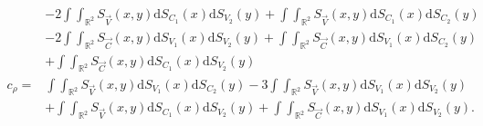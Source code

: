 \begin{theorem}
\begin{align*}
        &-2\int\int_{\mathbb{R}^2}S_{\vec{V}}\left(x,y\right)\mathrm{d}S_{C_1}\left(x\right)\mathrm{d}S_{V_2}\left(y\right)+\int\int_{\mathbb{R}^2}S_{\vec{V}}\left(x,y\right)\mathrm{d}S_{C_1}\left(x\right)\mathrm{d}S_{C_2}\left(y\right)\\
        &-2\int\int_{\mathbb{R}^2}S_{\vec{C}}\left(x,y\right)\mathrm{d}S_{V_1}\left(x\right)\mathrm{d}S_{V_2}\left(y\right)+\int\int_{\mathbb{R}^2}S_{\vec{C}}\left(x,y\right)\mathrm{d}S_{V_1}\left(x\right)\mathrm{d}S_{C_2}\left(y\right)\\
        &+\int\int_{\mathbb{R}^2}S_{\vec{C}}\left(x,y\right)\mathrm{d}S_{C_1}\left(x\right)\mathrm{d}S_{V_2}\left(y\right)\\
        c_\rho=&\int\int_{\mathbb{R}^2}S_{\vec{V}}\left(x,y\right)\mathrm{d}S_{V_1}\left(x\right)\mathrm{d}S_{C_2}\left(y\right)-3\int\int_{\mathbb{R}^2}S_{\vec{V}}\left(x,y\right)\mathrm{d}S_{V_1}\left(x\right)\mathrm{d}S_{V_2}\left(y\right)\\
        &+\int\int_{\mathbb{R}^2}S_{\vec{V}}\left(x,y\right)\mathrm{d}S_{C_1}\left(x\right)\mathrm{d}S_{V_2}\left(y\right)+\int\int_{\mathbb{R}^2}S_{\vec{C}}\left(x,y\right)\mathrm{d}S_{V_1}\left(x\right)\mathrm{d}S_{V_2}\left(y\right).
    \end{align*}
\end{theorem}

